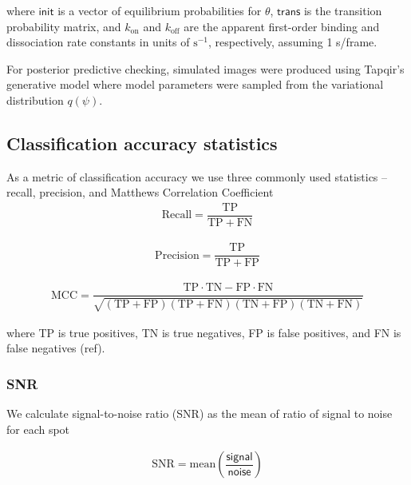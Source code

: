 \noindent
where $\mathsf{init}$ is a vector of equilibrium probabilities for $\theta$, $\mathsf{trans}$ is the transition probability matrix, and $k_{\mathrm{on}}$ and $k_{\mathrm{off}}$ are the apparent first-order binding and dissociation rate constants in units of $\mathrm{s}^{-1}$, respectively, assuming 1 s/frame.

For posterior predictive checking, simulated images were produced using Tapqir's generative model where model parameters were sampled from the variational distribution $q(\psi)$. %

\subsection*{Classification accuracy statistics}

As a metric of classification accuracy we use three commonly used statistics -- recall, precision, and Matthews Correlation Coefficient \cite{Matthews1975-rw}
\begin{gather*}
    \mathrm{Recall} = \dfrac{\mathrm{TP}}{\mathrm{TP} + \mathrm{FN}}
\end{gather*}

\begin{gather*}
    \mathrm{Precision} = \dfrac{\mathrm{TP}}{\mathrm{TP} + \mathrm{FP}}
\end{gather*}

\begin{gather*}
    \mathrm{MCC} =
        \dfrac{\mathrm{TP} \cdot \mathrm{TN} - \mathrm{FP} \cdot \mathrm{FN}}
        {\sqrt{(\mathrm{TP} + \mathrm{FP}) (\mathrm{TP} + \mathrm{FN}) (\mathrm{TN} + \mathrm{FP}) (\mathrm{TN} + \mathrm{FN})}}
\end{gather*}

\noindent
where TP is true positives, TN is true negatives, FP is false positives, and FN is false negatives (ref).

\subsubsection*{SNR}

We calculate signal-to-noise ratio (SNR) as the mean of ratio of signal to noise for each spot

\begin{gather*}
    \mathrm{SNR} = \mathrm{mean} \left( \dfrac{\mathsf{signal}}{\mathsf{noise}} \right)
\end{gather*}

